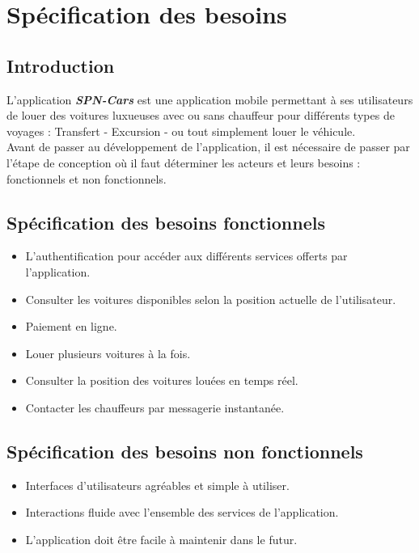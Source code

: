 \section{Spécification des besoins}
\subsection{Introduction}
L'application \textit{\textbf{SPN-Cars}} est une application mobile permettant à ses utilisateurs de louer des voitures luxueuses avec ou sans chauffeur pour différents types de voyages : Transfert - Excursion - ou tout simplement louer le véhicule.\\
\noindent Avant de passer au développement de l'application, il est nécessaire de passer par l'étape de conception où il faut déterminer les acteurs et leurs besoins : fonctionnels et non fonctionnels.
\subsection{Spécification des besoins fonctionnels}
\begin{itemize}
    \item L'authentification pour accéder aux différents services offerts par l'application.
    \item Consulter les voitures disponibles selon la position actuelle de l'utilisateur.
    \item Paiement en ligne.
    \item Louer plusieurs voitures à la fois.
    \item Consulter la position des voitures louées en temps réel.
    \item Contacter les chauffeurs par messagerie instantanée.
\end{itemize}
\subsection{Spécification des besoins non fonctionnels}
\begin{itemize}
    \item Interfaces d'utilisateurs agréables et simple à utiliser.
    \item Interactions fluide avec l'ensemble des services de l'application.
    \item L'application doit être facile à maintenir dans le futur.
\end{itemize}
